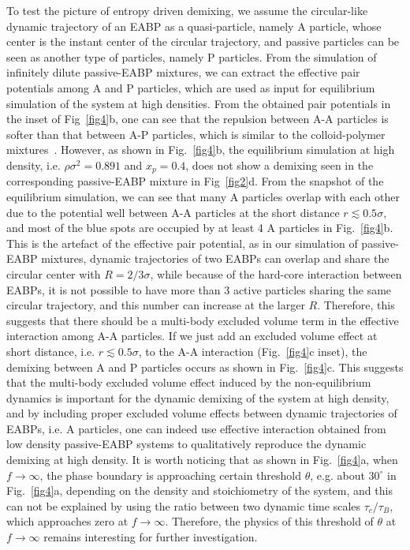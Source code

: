 \documentclass[prl, twocolumn, showpacs, preprintnumbers,amsmath,amssymb]{revtex4-1}
\begin{document}
To test the picture of entropy driven demixing, we assume the circular-like dynamic trajectory of an EABP as a quasi-particle, namely A particle, whose center is the instant center of the circular trajectory, and passive particles can be seen as another type of particles, namely P particles. From the simulation of infinitely dilute passive-EABP mixtures, we can extract the effective pair potentials among A and P particles, which are used as input for equilibrium simulation of the system at high densities. From the obtained pair potentials in the inset of Fig~\ref{fig4}b, one can see that the repulsion between A-A particles is softer than that between A-P particles, which is similar to the colloid-polymer mixtures~\cite{star_colloid}. However, as shown in Fig.~\ref{fig4}b, the equilibrium simulation at high density, i.e. $\rho \sigma^2 = 0.891$ and $x_p = 0.4$, does not show a demixing seen in the corresponding passive-EABP mixture in Fig~\ref{fig2}d. From the snapshot of the equilibrium simulation, we can see that many A particles overlap with each other due to the potential well between A-A particles at the short distance $r \lesssim 0.5\sigma$, and most of the blue spots are occupied by at least 4 A particles in Fig.~\ref{fig4}b. This is the artefact of the effective pair potential, as in our simulation of passive-EABP mixtures, dynamic trajectories of two EABPs can overlap and share the circular center with $R=2/3\sigma$, while because of the hard-core interaction between EABPs, it is not possible to have more than 3 active particles sharing the same circular trajectory, and this number can increase at the larger $R$. Therefore, this suggests that there should be a multi-body excluded volume term in the effective interaction among A-A particles.
If we just add an excluded volume effect at short distance, i.e. $r \lesssim 0.5\sigma$, to the A-A interaction (Fig.~\ref{fig4}c inset), the demixing between A and P particles occurs  as shown in Fig.~\ref{fig4}c. This suggests that the multi-body excluded volume effect induced by the non-equilibrium dynamics is important for the dynamic demixing of the system at high density, and by including proper excluded volume effects between dynamic trajectories of EABPs, i.e. A particles, one can indeed use effective interaction obtained from low density passive-EABP systems to qualitatively reproduce the dynamic demixing at high density. It is worth noticing that as shown in Fig.~\ref{fig4}a, when $f \rightarrow \infty$, the phase boundary is approaching certain threshold $\theta$, e.g. about $30^{\circ}$ in Fig.~\ref{fig4}a, depending on the density and stoichiometry of the system, and this can not be explained by using the ratio between two dynamic time scales $\tau_c/\tau_B$, which approaches zero at $f \rightarrow \infty$. Therefore, the physics of this threshold of $\theta$ at $f \rightarrow \infty$ remains interesting for further investigation.
\end{document}
